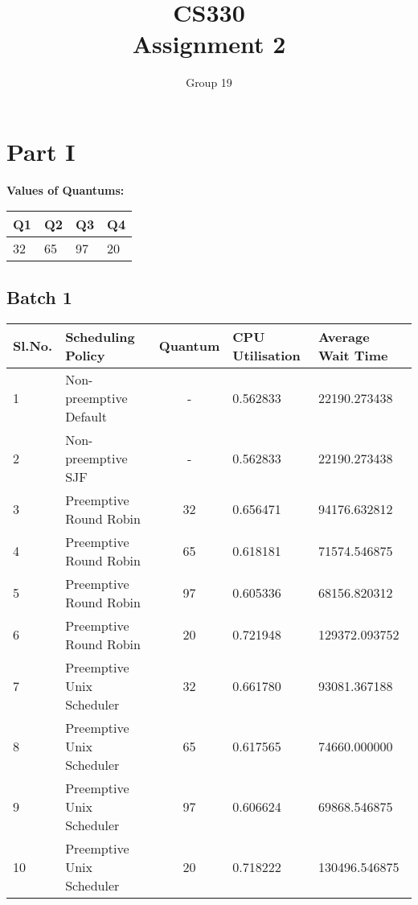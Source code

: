 \documentclass{article}
\author{Group 19}
\title{CS330 \\ Assignment 2}
\date{}
\begin{document}
\maketitle
\section{Part I}
\textbf{Values of Quantums:}\\

    \begin{tabular}{| l | l | l | l |}
    \hline
    Q1 & Q2 & Q3 & Q4 \\ \hline
    32 & 65 & 97 & 20 \\
    \hline
    \end{tabular}


\subsection{Batch 1}
    \begin{center}
    \begin{tabular}{| l | l | c | l | l |}
    \hline
    Sl.No. & Scheduling Policy & Quantum & CPU Utilisation & Average Wait Time \\ \hline
    1 & Non-preemptive Default & - & 0.562833 & 22190.273438 \\
    2 & Non-preemptive SJF  & - & 0.562833 & 22190.273438 \\
    3 & Preemptive Round Robin & 32 & 0.656471 & 94176.632812 \\
    4 & Preemptive Round Robin & 65 & 0.618181 & 71574.546875 \\
    5 & Preemptive Round Robin & 97 & 0.605336 & 68156.820312 \\
    6 & Preemptive Round Robin & 20 & 0.721948 & 129372.093752 \\
    7 & Preemptive Unix Scheduler & 32 & 0.661780 & 93081.367188 \\
    8 & Preemptive Unix Scheduler & 65 & 0.617565 & 74660.000000 \\
    9 & Preemptive Unix Scheduler & 97 & 0.606624 & 69868.546875 \\
    10 & Preemptive Unix Scheduler & 20 & 0.718222 & 130496.546875 \\
    \hline
    \end{tabular}
    \end{center}
\end{document}
